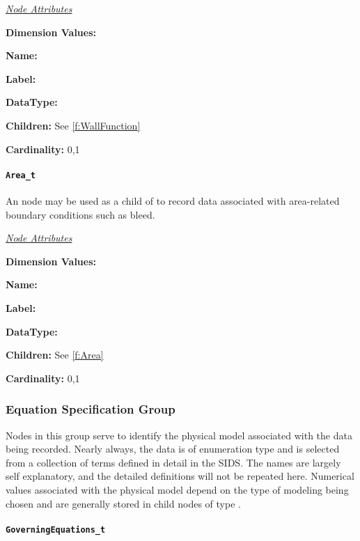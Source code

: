 \textit{\uline{Node Attributes}}
\begin{Ventryic}{\textbf{Dimension Values:}}
\item [\textbf{Name:}]
\item [\textbf{Label:}]
\item [\textbf{DataType:}]
\item [\textbf{Children:}]
      See \autoref{f:WallFunction}
\item [\textbf{Cardinality:}]
      0,1
\end{Ventryic}

\paragraph{\texttt{Area\_t}}

An  node may be used as a child of 
to record data associated with area-related boundary conditions such as
bleed.

\textit{\uline{Node Attributes}}
\begin{Ventryic}{\textbf{Dimension Values:}}
\item [\textbf{Name:}]
\item [\textbf{Label:}]
\item [\textbf{DataType:}]
\item [\textbf{Children:}]
      See \autoref{f:Area}
\item [\textbf{Cardinality:}]
      0,1
\end{Ventryic}

\subsubsection{Equation Specification Group}

Nodes in this group serve to identify the physical model associated
with the data being recorded. Nearly always, the data is of enumeration
type and is selected from a collection of terms defined in detail in
the SIDS.  The names are largely self explanatory, and the detailed
definitions will not be repeated here. Numerical values associated with
the physical model depend on the type of modeling being chosen and are
generally stored in child nodes of type .

\paragraph{\texttt{GoverningEquations\_t}}

